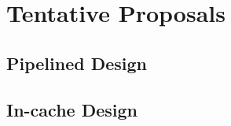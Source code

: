 \section{Tentative Proposals} \label{sec:proposals}

\subsection{Pipelined Design}

\subsection{In-cache Design}